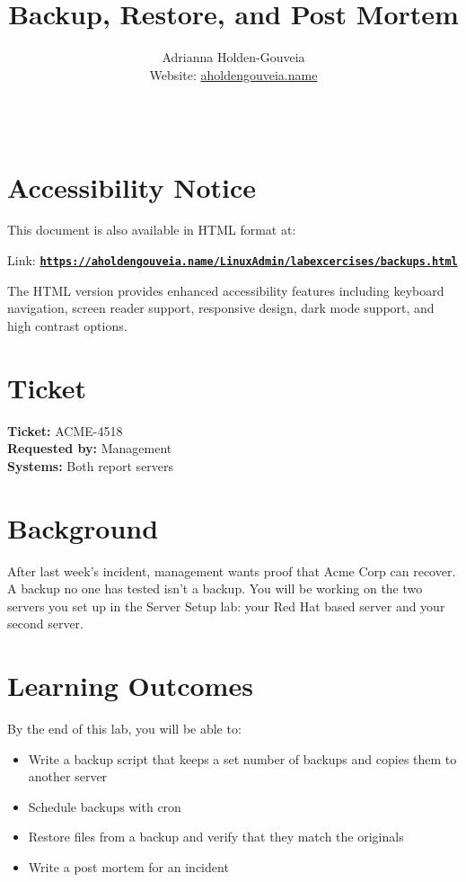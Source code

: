 \documentclass[12pt]{article}
\title{Backup, Restore, and Post Mortem}
\author{
        Adrianna Holden-Gouveia \\
        Website: \href{https://aholdengouveia.name}{aholdengouveia.name}\\ 
        \date{\vspace{-5ex}}
        \faGithub {: aholdengouveia} \\
        }
\begin{document}
    

\maketitle



\section*{Accessibility Notice}
This document is also available in HTML format at:

Link: \href{https://aholdengouveia.name/LinuxAdmin/labexcercises/backups.html}{\textbf{\nolinkurl{https://aholdengouveia.name/LinuxAdmin/labexcercises/backups.html}}}

The HTML version provides enhanced accessibility features including keyboard navigation, screen reader support, responsive design, dark mode support, and high contrast options.


\section*{Ticket}
\noindent\textbf{Ticket:} ACME-4518\\
\textbf{Requested by:} Management\\
\textbf{Systems:} Both report servers

\section*{Background}
After last week's incident, management wants proof that Acme Corp can recover. A backup no one has tested isn't a backup. You will be working on the two servers you set up in the Server Setup lab: your Red Hat based server and your second server.

\section*{Learning Outcomes}
By the end of this lab, you will be able to:
\begin{itemize}
    \item Write a backup script that keeps a set number of backups and copies them to another server
    \item Schedule backups with cron
    \item Restore files from a backup and verify that they match the originals
    \item Write a post mortem for an incident
\end{itemize}
\end{document}
